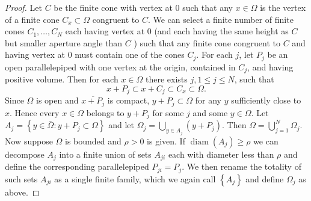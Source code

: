 \begin{proof}
  Let $C$ be the finite cone with vertex at 0 such that any $x \in \Omega$ is the vertex of a finite cone $C_x \subset \Omega$ congruent to $C$. We can select a finite number of finite cones $C_1, \ldots, C_N$ each having vertex at 0 (and each having the same height as $C$ but smaller aperture angle than $C$ ) such that any finite cone congruent to $C$ and having vertex at 0 must contain one of the cones $C_j$. For each $j$, let $P_j$ be an open parallelepiped with one vertex at the origin, contained in $C_j$, and having positive volume. Then for each $x \in \Omega$ there exists $j, 1 \leq j \leq N$, such that
  \[
  x+P_j \subset x+C_j \subset C_x \subset \Omega .
  \]
  Since $\Omega$ is open and $\overline{x+P_j}$ is compact, $y+P_j \subset \Omega$ for any $y$ sufficiently close to $x$. Hence every $x \in \Omega$ belongs to $y+P_j$ for some $j$ and some $y \in \Omega$. Let $A_j=\left\{y \in \bar{\Omega}: y+P_j \subset \Omega\right\}$ and let $\Omega_j=\bigcup_{y \in A_j}\left(y+P_j\right)$. Then $\Omega=\bigcup_{j=1}^N \Omega_j$. Now suppose $\Omega$ is bounded and $\rho>0$ is given. If $\operatorname{diam}\left(A_j\right) \geq \rho$ we can decompose $A_j$ into a finite union of sets $A_{j i}$ each with diameter less than $\rho$ and define the corresponding parallelepiped $P_{j i}=P_j$. We then rename the totality of such sets $A_{j i}$ as a single finite family, which we again call $\left\{A_j\right\}$ and define $\Omega_j$ as above.
  

\end{proof}
